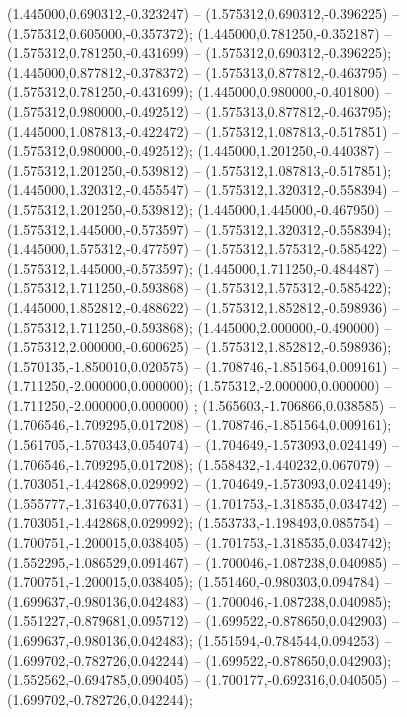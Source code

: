  (1.445000,0.690312,-0.323247) -- (1.575312,0.690312,-0.396225) -- (1.575312,0.605000,-0.357372);
 (1.445000,0.781250,-0.352187) -- (1.575312,0.781250,-0.431699) -- (1.575312,0.690312,-0.396225);
 (1.445000,0.877812,-0.378372) -- (1.575313,0.877812,-0.463795) -- (1.575312,0.781250,-0.431699);
 (1.445000,0.980000,-0.401800) -- (1.575312,0.980000,-0.492512) -- (1.575313,0.877812,-0.463795);
 (1.445000,1.087813,-0.422472) -- (1.575312,1.087813,-0.517851) -- (1.575312,0.980000,-0.492512);
 (1.445000,1.201250,-0.440387) -- (1.575312,1.201250,-0.539812) -- (1.575312,1.087813,-0.517851);
 (1.445000,1.320312,-0.455547) -- (1.575312,1.320312,-0.558394) -- (1.575312,1.201250,-0.539812);
 (1.445000,1.445000,-0.467950) -- (1.575312,1.445000,-0.573597) -- (1.575312,1.320312,-0.558394);
 (1.445000,1.575312,-0.477597) -- (1.575312,1.575312,-0.585422) -- (1.575312,1.445000,-0.573597);
 (1.445000,1.711250,-0.484487) -- (1.575312,1.711250,-0.593868) -- (1.575312,1.575312,-0.585422);
 (1.445000,1.852812,-0.488622) -- (1.575312,1.852812,-0.598936) -- (1.575312,1.711250,-0.593868);
 (1.445000,2.000000,-0.490000) -- (1.575312,2.000000,-0.600625) -- (1.575312,1.852812,-0.598936);
 (1.570135,-1.850010,0.020575) -- (1.708746,-1.851564,0.009161) -- (1.711250,-2.000000,0.000000);
 (1.575312,-2.000000,0.000000) -- (1.711250,-2.000000,0.000000) ;
 (1.565603,-1.706866,0.038585) -- (1.706546,-1.709295,0.017208) -- (1.708746,-1.851564,0.009161);
 (1.561705,-1.570343,0.054074) -- (1.704649,-1.573093,0.024149) -- (1.706546,-1.709295,0.017208);
 (1.558432,-1.440232,0.067079) -- (1.703051,-1.442868,0.029992) -- (1.704649,-1.573093,0.024149);
 (1.555777,-1.316340,0.077631) -- (1.701753,-1.318535,0.034742) -- (1.703051,-1.442868,0.029992);
 (1.553733,-1.198493,0.085754) -- (1.700751,-1.200015,0.038405) -- (1.701753,-1.318535,0.034742);
 (1.552295,-1.086529,0.091467) -- (1.700046,-1.087238,0.040985) -- (1.700751,-1.200015,0.038405);
 (1.551460,-0.980303,0.094784) -- (1.699637,-0.980136,0.042483) -- (1.700046,-1.087238,0.040985);
 (1.551227,-0.879681,0.095712) -- (1.699522,-0.878650,0.042903) -- (1.699637,-0.980136,0.042483);
 (1.551594,-0.784544,0.094253) -- (1.699702,-0.782726,0.042244) -- (1.699522,-0.878650,0.042903);
 (1.552562,-0.694785,0.090405) -- (1.700177,-0.692316,0.040505) -- (1.699702,-0.782726,0.042244);
